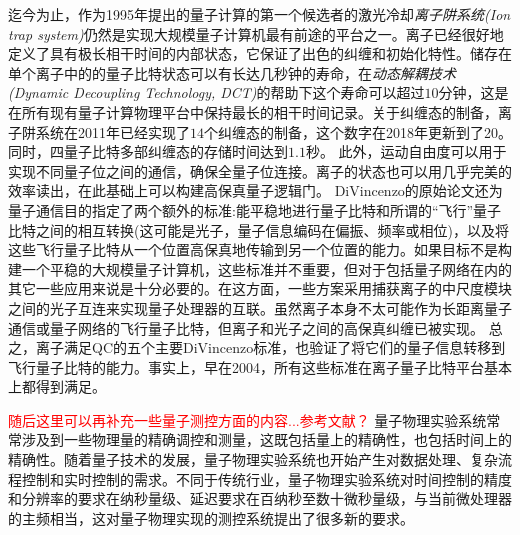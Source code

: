 迄今为止，作为1995年提出的量子计算的第一个候选者的激光冷却\emph{离子阱系统(Ion trap system)}仍然是实现大规模量子计算机最有前途的平台之一。离子已经很好地定义了具有极长相干时间\cite[]{Fisk_Sellars_Lawn_Coles_1997}的内部状态，它保证了出色的纠缠和初始化特性\cite[]{Blatt_Wineland_2008}。储存在单个离子中的的量子比特状态可以有长达几秒钟的寿命\cite[]{Langer_Ozeri_Jost_Chiaverini_DeMarco_Ben_Kish_Blakestad_Britton_Hume_Itano_et_al_2005}，在\emph{动态解耦技术(Dynamic Decoupling Technology, DCT)}的帮助下这个寿命可以超过$10$分钟\cite[]{Wang_Um_Zhang_An_Lyu_Zhang_Duan_Yum_Kim_2017}，这是在所有现有量子计算物理平台中保持最长的相干时间记录。关于纠缠态的制备，离子阱系统在2011年已经实现了$14$个纠缠态的制备\cite[]{Monz_Schindler_Barreiro_Chwalla_Nigg_Coish_Harlander_Hänsel_Hennrich_Blatt_2011}，这个数字在2018年更新到了20\cite[]{Friis_Marty_Maier_Hempel_Holzäpfel_Jurcevic_Plenio_Huber_Roos_Blatt_et_al_2018}。同时，四量子比特多部纠缠态的存储时间达到$1.1$秒\cite[]{Kaufmann_Ruster_Schmiegelow_Luda_Kaushal_Schulz_von_Lindenfels_Schmidt_Kaler_Poschinger_2017}。
此外，运动自由度可以用于实现不同量子位之间的通信，确保全量子位连接\cite[]{Debnath_Linke_Figgatt_Landsman_Wright_Monroe_2016}。离子的状态也可以用几乎完美的效率读出\cite[]{Myerson_Szwer_Webster_Allcock_Curtis_Imreh_Sherman_Stacey_Steane_Lucas_2008}，在此基础上可以构建高保真量子逻辑门\cite[]{Ballance_Harty_Linke_Sepiol_Lucas_2016}。
DiVincenzo的原始论文还为量子通信目的指定了两个额外的标准:能平稳地进行量子比特和所谓的“飞行”量子比特之间的相互转换(这可能是光子，量子信息编码在偏振、频率或相位)，以及将这些飞行量子比特从一个位置高保真地传输到另一个位置的能力。如果目标不是构建一个平稳的大规模量子计算机，这些标准并不重要，但对于包括量子网络在内的其它一些应用来说是十分必要的。在这方面，一些方案采用捕获离子的中尺度模块之间的光子互连来实现量子处理器的互联\cite[]{Monroe_Raussendorf_Ruthven_Brown_Maunz_Duan_Kim_2014}。虽然离子本身不太可能作为长距离量子通信或量子网络的飞行量子比特，但离子和光子之间的高保真纠缠已被实现\cite[]{Moehring_Blinov_Madsen_Duan_Monroe_2004}。
总之，离子满足QC的五个主要DiVincenzo标准，也验证了将它们的量子信息转移到飞行量子比特的能力。事实上，早在2004，所有这些标准在离子量子比特平台基本上都得到满足\cite[]{Leibfried_DeMarco_Meyer_Lucas_Barrett_Britton_Itano_Jelenković_Langer_Rosenband_et_al_2003,Moehring_Blinov_Madsen_Duan_Monroe_2004}。

\textcolor{red}{随后这里可以再补充一些量子测控方面的内容...参考文献？}
量子物理实验系统常常涉及到一些物理量的精确调控和测量，这既包括量上的精确性，也包括时间上的精确性。随着量子技术的发展，量子物理实验系统也开始产生对数据处理、复杂流程控制和实时控制的需求。不同于传统行业，量子物理实验系统对时间控制的精度和分辨率的要求在纳秒量级、延迟要求在百纳秒至数十微秒量级，与当前微处理器的主频相当，这对量子物理实现的测控系统提出了很多新的要求。

